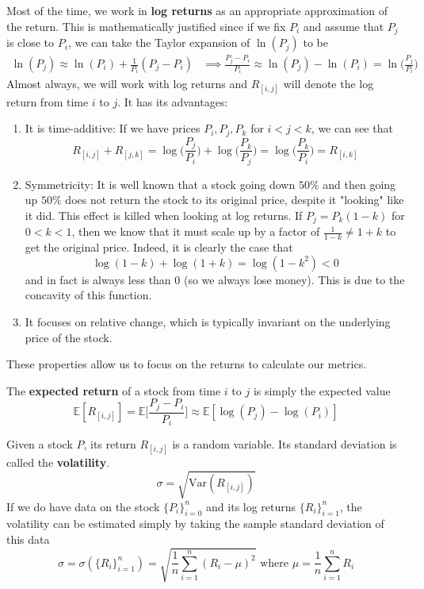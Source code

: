 \documentclass{article}
\begin{document}
    Most of the time, we work in \textbf{log returns} as an appropriate approximation of the return. This is mathematically justified since if we fix $P_i$ and assume that $P_{j}$ is close to $P_i$, we can take the Taylor expansion of $\ln(P_j)$ to be 
    \begin{align*}
      \ln(P_j) \approx \ln(P_i) + \frac{1}{P_i} (P_j - P_i) & \implies \frac{P_j - P_i}{P_i} \approx \ln(P_j) - \ln(P_i) = \ln \bigg(\frac{P_j}{P_i} \bigg)
    \end{align*}
    Almost always, we will work with log returns and $R_{[i, j]}$ will denote the log return from time $i$ to $j$. It has its advantages: 
    \begin{enumerate}
      \item It is time-additive: If we have prices $P_i, P_j, P_k$ for $i < j < k$, we can see that 
      \[R_{[i, j]} + R_{[j, k]} = \log \bigg(\frac{P_j}{P_i}\bigg) + \log \bigg( \frac{P_k}{P_j} \bigg) = \log \bigg(\frac{P_k}{P_i} \bigg) = R_{[i, k]}\] 

      \item Symmetricity: It is well known that a stock going down $50\%$ and then going up $50\%$ does not return the stock to its original price, despite it "looking" like it did. This effect is killed when looking at log returns. If $P_j = P_k (1 - k)$ for $0 < k < 1$, then we know that it must scale up by a factor of $\frac{1}{1 - k} \neq 1 + k$ to get the original price. Indeed, it is clearly the case that 
      \[\log(1 - k) + \log(1 + k) = \log(1 - k^2) < 0\]
      and in fact is always less than $0$ (so we always lose money). This is due to the concavity of this function. 
      
      \item It focuses on relative change, which is typically invariant on the underlying price of the stock. 
    \end{enumerate}

    These properties allow us to focus on the returns to calculate our metrics. 

    \begin{definition}
      The \textbf{expected return} of a stock from time $i$ to $j$ is simply the expected value 
      \[\mathbb{E}[R_{[i, j]}] = \mathbb{E} \bigg[ \frac{P_j - P_i}{P_i} \bigg] \approx \mathbb{E} [ \log(P_j) - \log(P_i) ] \]
    \end{definition}

    \begin{definition}
      Given a stock $P$, its return $R_{[i, j]}$ is a random variable. Its standard deviation is called the \textbf{volatility}. 
      \[\sigma = \sqrt{\mathrm{Var}(R_{[i, j]})}\]
      If we do have data on the stock $\{P_i\}_{i=0}^n$ and its log returns $\{R_i\}_{i=1}^n$, the volatility can be estimated simply by taking the sample standard deviation of this data 
      \[\sigma = \sigma(\{R_i\}_{i=1}^n) = \sqrt{\frac{1}{n} \sum_{i=1}^n (R_i - \mu)^2 } \text{ where } \mu = \frac{1}{n} \sum_{i=1}^n R_i\]
    \end{definition}
\end{document}
